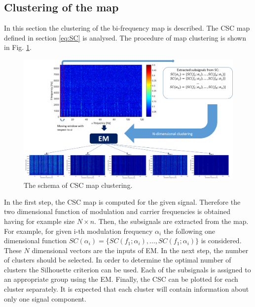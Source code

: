 \documentclass[11pt]{article}
\begin{document}
\subsection{Clustering of the map}
In this section the clustering of the bi-frequency map is described. The CSC map defined in section \ref{eq:SC} is analysed. The procedure of  map clustering is shown in Fig. \ref{fig:clustering}. 
\begin{figure}[h!]
\begin{center}
\includegraphics[width=\textwidth]{wykresy/schemat1.png}
\caption{The schema of CSC map clustering.}
\label{fig:clustering}
\end{center}
\end{figure}
In the first step, the CSC map is computed for the given signal. Therefore the two dimensional function of modulation and carrier frequencies is obtained having for example size $N \times n$.  Then, the subsignals are extracted from the map. For example, for given i-th modulation frequency $\alpha_i$ the following one dimensional function $SC(\alpha_i)=\{SC(f_1;\alpha_i),\dots ,SC(f_1;\alpha_i)\}$ is considered. These $N$ dimensional vectors are the inputs of EM. In the next step, the number of clusters should be selected. In order to determine the optimal number of clusters the Silhouette criterion can be used. Each of the subsignals  is assigned to an appropriate group using the EM. Finally, the CSC can be plotted for each cluster separately. It is expected that each cluster will contain information about only one signal component. 
%
%
\end{document}
